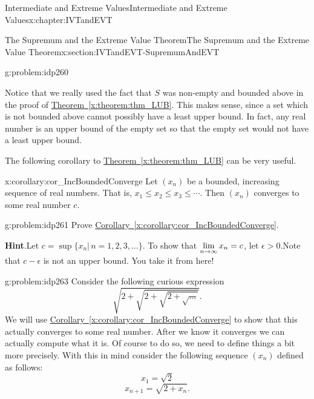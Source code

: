 \begin{chapterptx}{Intermediate and Extreme Values}{}{Intermediate and Extreme Values}{}{}{x:chapter:IVTandEVT}
\begin{sectionptx}{The Supremum and the Extreme Value Theorem}{}{The Supremum and the Extreme Value Theorem}{}{}{x:section:IVTandEVT-SupremumAndEVT}
\begin{problem}{}{g:problem:idp260}
		\end{problem}
		Notice that we really used the fact that \(S\) was non-empty and bounded above in the proof of \hyperref[x:theorem:thm_LUB]{Theorem~{\xreffont\ref{x:theorem:thm_LUB}}}. This makes sense, since a set which is not bounded above cannot possibly have a least upper bound. In fact, any real number is an upper bound of the empty set so that the empty set would not have a least upper bound.%
		\par
		The following corollary to \hyperref[x:theorem:thm_LUB]{Theorem~{\xreffont\ref{x:theorem:thm_LUB}}} can be very useful.%
		\begin{corollary}{}{}{x:corollary:cor_IncBoundedConverge}%
			Let \((x_n)\) be a bounded, increasing sequence of real numbers. That is, \(x_1\leq x_2\leq x_3\leq\cdots\). Then \((x_n)\) converges to some real number \(c\).%
		\end{corollary}
		\begin{problem}{}{g:problem:idp261}%
			 Prove \hyperref[x:corollary:cor_IncBoundedConverge]{Corollary~{\xreffont\ref{x:corollary:cor_IncBoundedConverge}}}.%
			\par\smallskip%
			\noindent\textbf{\blocktitlefont Hint}.\hypertarget{g:hint:idp262}{}\quad{}Let \(c=\sup\{x_n|\,n=1,2,3,\ldots\}\). To show that \({\displaystyle\lim_{n\rightarrow \infty}x_n}=c\), let \(\epsilon>0.\)Note that \(c-\epsilon\) is not an upper bound. You take it from here!%
		\end{problem}
		\begin{problem}{}{g:problem:idp263}%
			 Consider the following curious expression%
			\begin{equation*}
				\sqrt{2+\sqrt{2+\sqrt{2+\sqrt{...}}}}\text{.}
			\end{equation*}
			We will use \hyperref[x:corollary:cor_IncBoundedConverge]{Corollary~{\xreffont\ref{x:corollary:cor_IncBoundedConverge}}} to show that this actually converges to some real number. After we know it converges we can actually compute what it is. Of course to do so, we need to define things a bit more precisely. With this in mind consider the following sequence \(\left(x_n\right)\) defined as follows:%
			\begin{equation*}
				x_1=\sqrt{2}
			\end{equation*}
			\begin{equation*}
				x_{n+1}=\sqrt{2+x_n}\text{.}
			\end{equation*}

\end{problem}
\end{sectionptx}
\end{chapterptx}

